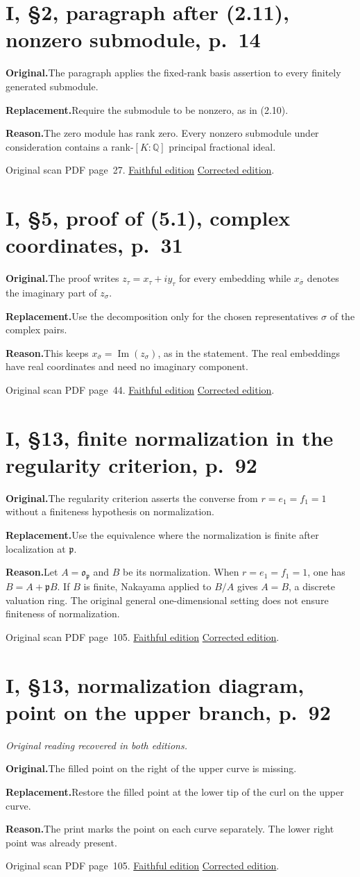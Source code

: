\documentclass[11pt,a4paper]{article}
\newcommand{\original}{\par\smallskip\noindent\textbf{Original.}\enspace}
\newcommand{\replacement}{\par\smallskip\noindent\textbf{Replacement.}\enspace}
\newcommand{\reason}{\par\smallskip\noindent\textbf{Reason.}\enspace}
\newcommand{\editionlink}[3]{\href{#1\#errata.#2}{#3}}
\newcommand{\location}[2]{%
  \par\smallskip\noindent Original scan PDF page~#2.\enspace
  \editionlink{Neukirch_Faithful.pdf}{#1}{Faithful edition}
  \quad\editionlink{Neukirch_Corrected.pdf}{#1}{Corrected edition}.}
\begin{document}
\section{I, \S2, paragraph after (2.11), nonzero submodule, p.~14}\label{errata:item:186}

\original The paragraph applies the fixed-rank basis assertion to every finitely generated submodule.
\replacement Require the submodule to be nonzero, as in (2.10).
\reason The zero module has rank zero. Every nonzero submodule under consideration contains a rank-$[K:\mathbb Q]$ principal fractional ideal.
\location{186}{27}

\setcounter{section}{186}
\section{I, \S5, proof of (5.1), complex coordinates, p.~31}\label{errata:item:187}

\original The proof writes $z_\tau=x_\tau+iy_\tau$ for every embedding while $x_{\bar\sigma}$ denotes the imaginary part of $z_\sigma$.
\replacement Use the decomposition only for the chosen representatives $\sigma$ of the complex pairs.
\reason This keeps $x_{\bar\sigma}=\operatorname{Im}(z_\sigma)$, as in the statement. The real embeddings have real coordinates and need no imaginary component.
\location{187}{44}

\setcounter{section}{187}
\section{I, \S13, finite normalization in the regularity criterion, p.~92}\label{errata:item:188}

\original The regularity criterion asserts the converse from $r=e_1=f_1=1$ without a finiteness hypothesis on normalization.
\replacement Use the equivalence where the normalization is finite after localization at $\mathfrak p$.
\reason Let $A=\mathfrak o_{\mathfrak p}$ and $B$ be its normalization. When $r=e_1=f_1=1$, one has $B=A+\mathfrak p B$. If $B$ is finite, Nakayama applied to $B/A$ gives $A=B$, a discrete valuation ring. The original general one-dimensional setting does not ensure finiteness of normalization.
\location{188}{105}

\setcounter{section}{188}
\section{I, \S13, normalization diagram, point on the upper branch, p.~92}\label{errata:item:189}
\noindent\emph{Original reading recovered in both editions.}\par
\original The filled point on the right of the upper curve is missing.
\replacement Restore the filled point at the lower tip of the curl on the upper curve.
\reason The print marks the point on each curve separately. The lower right point was already present.
\location{189}{105}
\end{document}
